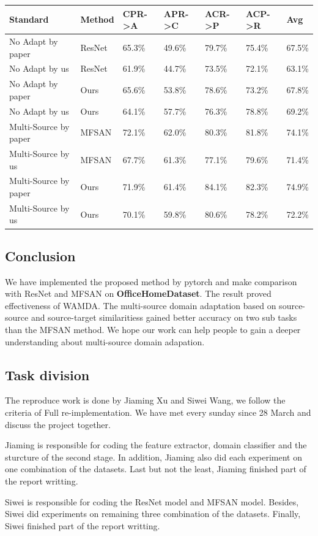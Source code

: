 \documentclass[11pt]{article}
\begin{document}
\begin{longtable}[]{@{}lllllll@{}}
\toprule
Standard & Method & CPR-\textgreater{}A & APR-\textgreater{}C &
ACR-\textgreater{}P & ACP-\textgreater{}R & Avg\tabularnewline
\midrule
\endhead
No Adapt by paper & ResNet & 65.3\% & 49.6\% & 79.7\% & 75.4\% &
67.5\%\tabularnewline
No Adapt by us & ResNet & 61.9\% & 44.7\% & 73.5\% & 72.1\% &
63.1\%\tabularnewline
No Adapt by paper & Ours & 65.6\% & 53.8\% & 78.6\% & 73.2\% &
67.8\%\tabularnewline
No Adapt by us & Ours & 64.1\% & 57.7\% & 76.3\% & 78.8\% &
69.2\%\tabularnewline
Multi-Source by paper & MFSAN & 72.1\% & 62.0\% & 80.3\% & 81.8\% &
74.1\%\tabularnewline
Multi-Source by us & MFSAN & 67.7\% & 61.3\% & 77.1\% & 79.6\% &
71.4\%\tabularnewline
Multi-Source by paper & Ours & 71.9\% & 61.4\% & 84.1\% & 82.3\% &
74.9\%\tabularnewline
Multi-Source by us & Ours & 70.1\% & 59.8\% & 80.6\% & 78.2\% &
72.2\%\tabularnewline
\bottomrule
\end{longtable}

    \hypertarget{conclusion}{%
\subsection{Conclusion}\label{conclusion}}

We have implemented the proposed method by pytorch and make comparison
with ResNet and MFSAN on \textbf{OfficeHomeDataset}. The result proved
effectiveness of WAMDA. The multi-source domain adaptation based on
source-source and source-target similaritiess gained better accuracy on
two sub tasks than the MFSAN method. We hope our work can help people to
gain a deeper understanding about multi-source domain adapation.

    \hypertarget{task-division}{%
\subsection{Task division}\label{task-division}}

The reproduce work is done by Jiaming Xu and Siwei Wang, we follow the
criteria of Full re-implementation. We have met every sunday since 28
March and discuss the project together.

Jiaming is responsible for coding the feature extractor, domain
classifier and the sturcture of the second stage. In addition, Jiaming
also did each experiment on one combination of the datasets. Last but
not the least, Jiaming finished part of the report writting.

Siwei is responsible for coding the ResNet model and MFSAN model.
Besides, Siwei did experiments on remaining three combination of the
datasets. Finally, Siwei finished part of the report writting.


    
    
    
    
\end{document}

